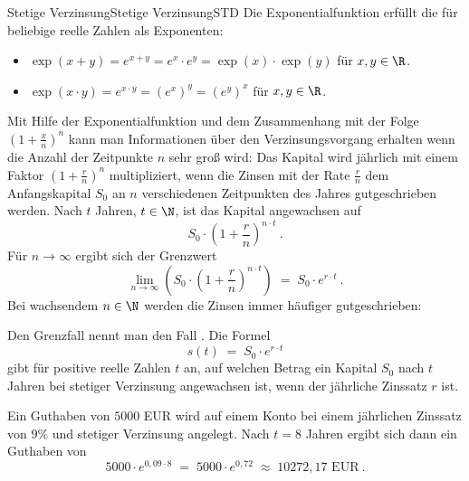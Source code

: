 \begin{MXContent}{Stetige Verzinsung}{Stetige Verzinsung}{STD}
Die Exponentialfunktion erfüllt die  für beliebige reelle Zahlen als Exponenten:
\begin{itemize}
\item{$\exp(x+y)=e^{x+y}=e^{x}\cdot e^{y}=\exp (x)\cdot \exp (y)$ für $x,y\in\R$.}
\item{$\exp (x\cdot y)=e^{x\cdot y}=\left( e^{x} \right)^{y}= \left( e^{y} \right)^{x}$ für $x,y\in\R$.}
\end{itemize}

Mit Hilfe der Exponentialfunktion und dem Zusammenhang mit der Folge $(1+\frac{x}{n})^n$ kann man
Informationen über den Verzinsungsvorgang erhalten wenn die Anzahl der Zeitpunkte $n$ sehr groß wird: Das Kapital wird jährlich mit einem Faktor
$\left(1+\frac{r}{n} \right)^{n}$ multipliziert, wenn die Zinsen mit der Rate $\frac{r}{n}$ dem Anfangskapital $S_{0}$ an $n$ verschiedenen Zeitpunkten des Jahres gutgeschrieben werden.
Nach $t$ Jahren, $t\in\N$, ist das Kapital angewachsen auf
$$
S_{0}\cdot \left({1+ \frac{r}{n}}\right)^{n\cdot t}\: .
$$
Für $n\rightarrow \infty$ ergibt sich der Grenzwert
$$
\lim\limits_{n\rightarrow \infty} \left({S_{0}\cdot \left({1+\frac{r}{n}} \right)^{n\cdot t}}\right) \; =\; S_{0}\cdot e^{r\cdot t}\: .
$$
Bei wachsendem $n\in \N$ werden die Zinsen immer häufiger gutgeschrieben:

\begin{MInfo}
Den Grenzfall nennt man den Fall .
Die Formel
$$
s(t)\; =\; S_{0}\cdot e^{r\cdot t}
$$
gibt für positive reelle Zahlen $t$ an, auf welchen Betrag ein Kapital $S_{0}$ nach $t$ Jahren bei stetiger Verzinsung angewachsen ist, wenn der jährliche Zinssatz $r$ ist.
\end{MInfo}

\begin{MExample}
Ein Guthaben von $5000$ EUR wird auf einem Konto bei einem jährlichen Zinssatz von $9\%$ und stetiger Verzinsung angelegt. Nach $t=8$ Jahren ergibt sich dann ein Guthaben von
$$
5000\cdot e^{0,09\cdot 8}\; =\; 5000\cdot e^{0,72}\; \approx\; 10272,17 \text{ EUR}\: .
$$
\end{MExample}

\end{MXContent}


